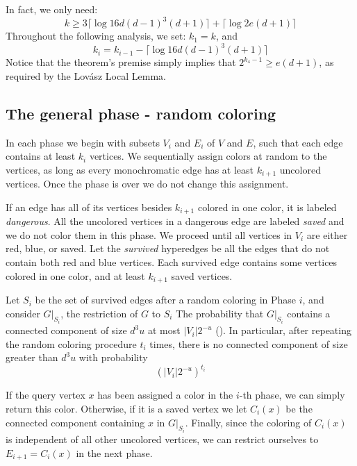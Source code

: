 \documentclass[english, oribibl]{llncs}
\begin{document}
In fact, we only need:
$$ k \geq 3 \lceil \log{16d(d-1)^{3}(d+1)} \rceil + 
			\lceil \log{2e(d+1)} \rceil $$
Throughout the following analysis, we set: 
$ k_1 = k $, and $$ k_i = k_{i-1} - \lceil \log{16d(d-1)^{3}(d+1)} \rceil$$
Notice that the theorem's premise simply implies that $ 2^{k_4-1} \geq e(d+1) $, as required by the Lov{\'{a}}sz Local Lemma.



\subsection{The general phase - random coloring}
In each phase we begin with subsets $V_i$ and $E_i$ of $V$ and $E$,
such that each edge contains at least $k_i$ vertices.
We sequentially assign colors at random to the vertices, as long as every monochromatic edge
has at least $k_{i+1}$ uncolored vertices.
Once the phase is over we do not change this assignment.

If an edge has all of its vertices besides $k_{i+1}$ colored in one color, it is labeled \emph{dangerous}. 
All the uncolored vertices in a dangerous edge are labeled \emph{saved} and we do not color them in this phase.
We proceed until all vertices in $V_i$ are either red, blue, or saved.
Let the \emph{survived} hyperedges be all the edges that do not contain both red and blue vertices.
Each survived edge contains some vertices colored in one color, and at least $k_{i+1}$ saved vertices.

Let $S_i$ be the set of survived edges after a random coloring in Phase $i$, and consider $G|_{S_i}$, the restriction of $G$ to $S_i$
The probability that $G|_{S_i}$ contains a connected component of size $d^3u$ at most $|V_i|2^{-u}$ (\cite{Alo91}).
In particular, after repeating the random coloring procedure $t_i$ times, 
there is no connected component of size greater than $d^3u$ with probability
$$\left(|V_i|2^{-u}\right)^{t_i}$$

If the query vertex $x$ has been assigned a color in the $i$-th phase, we can simply return this color.
Otherwise, if it is a saved vertex we let $C_i(x)$ be the connected component containing $x$ in $G|_{S_i}$.
Finally, since the coloring of $C_i(x)$ is independent of all other uncolored vertices,
we can restrict ourselves to $E_{i+1} = C_i(x)$ in the next phase.
\end{document}

